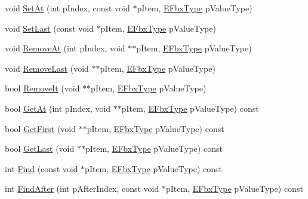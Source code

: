 \begin{DoxyCompactItemize}
\item 
void \hyperlink{class_fbx_layer_element_array_a12fea380179191ef325696045a60d6f9}{Set\+At} (int p\+Index, const void $\ast$p\+Item, \hyperlink{fbxpropertytypes_8h_a73913a5ddfb20e57c6f25e9e6784bd92}{E\+Fbx\+Type} p\+Value\+Type)
\item 
void \hyperlink{class_fbx_layer_element_array_a05706c8479fb3d84325a41464d7fa9dd}{Set\+Last} (const void $\ast$p\+Item, \hyperlink{fbxpropertytypes_8h_a73913a5ddfb20e57c6f25e9e6784bd92}{E\+Fbx\+Type} p\+Value\+Type)
\item 
void \hyperlink{class_fbx_layer_element_array_a70d291c84318eea45de6656b37b1c8c5}{Remove\+At} (int p\+Index, void $\ast$$\ast$p\+Item, \hyperlink{fbxpropertytypes_8h_a73913a5ddfb20e57c6f25e9e6784bd92}{E\+Fbx\+Type} p\+Value\+Type)
\item 
void \hyperlink{class_fbx_layer_element_array_a928f848275334427d958c996e10e2535}{Remove\+Last} (void $\ast$$\ast$p\+Item, \hyperlink{fbxpropertytypes_8h_a73913a5ddfb20e57c6f25e9e6784bd92}{E\+Fbx\+Type} p\+Value\+Type)
\item 
bool \hyperlink{class_fbx_layer_element_array_a759b4eac1b85286b6eae39b588eb74ad}{Remove\+It} (void $\ast$$\ast$p\+Item, \hyperlink{fbxpropertytypes_8h_a73913a5ddfb20e57c6f25e9e6784bd92}{E\+Fbx\+Type} p\+Value\+Type)
\item 
bool \hyperlink{class_fbx_layer_element_array_a4645b72542ad4745b54faa4e0e919878}{Get\+At} (int p\+Index, void $\ast$$\ast$p\+Item, \hyperlink{fbxpropertytypes_8h_a73913a5ddfb20e57c6f25e9e6784bd92}{E\+Fbx\+Type} p\+Value\+Type) const
\item 
bool \hyperlink{class_fbx_layer_element_array_ad54e636bdab3dfb407cb0561ae6460e0}{Get\+First} (void $\ast$$\ast$p\+Item, \hyperlink{fbxpropertytypes_8h_a73913a5ddfb20e57c6f25e9e6784bd92}{E\+Fbx\+Type} p\+Value\+Type) const
\item 
bool \hyperlink{class_fbx_layer_element_array_a67aeb0dde8b3535d83dcf9eab97e78ae}{Get\+Last} (void $\ast$$\ast$p\+Item, \hyperlink{fbxpropertytypes_8h_a73913a5ddfb20e57c6f25e9e6784bd92}{E\+Fbx\+Type} p\+Value\+Type) const
\item 
int \hyperlink{class_fbx_layer_element_array_ad5075288db8274e13b13f14ec8414dec}{Find} (const void $\ast$p\+Item, \hyperlink{fbxpropertytypes_8h_a73913a5ddfb20e57c6f25e9e6784bd92}{E\+Fbx\+Type} p\+Value\+Type) const
\item 
int \hyperlink{class_fbx_layer_element_array_aa4d2a9a111e4bc4d98c84a18efd65cbd}{Find\+After} (int p\+After\+Index, const void $\ast$p\+Item, \hyperlink{fbxpropertytypes_8h_a73913a5ddfb20e57c6f25e9e6784bd92}{E\+Fbx\+Type} p\+Value\+Type) const

\end{DoxyCompactItemize}
